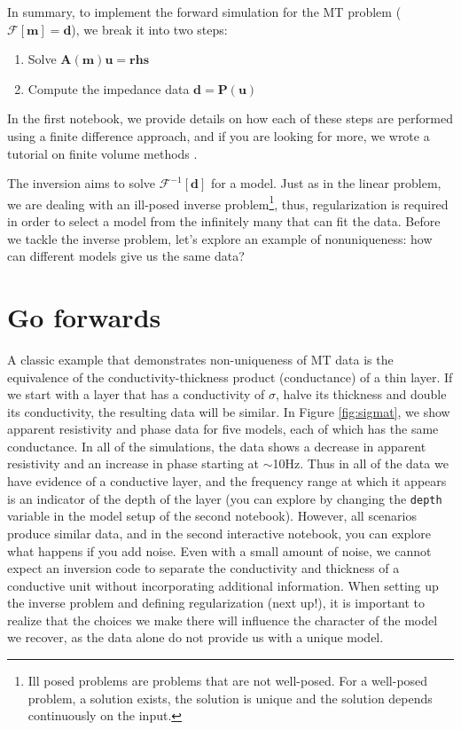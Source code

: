\documentclass[11pt,oneside]{article}
\begin{document}
In summary, to implement the forward simulation for the MT problem ($\mathcal{F}[\mathbf{m}] = \mathbf{d}$), we break it into two steps:
\begin{enumerate}
    \item Solve $\mathbf{A}(\mathbf{m})\mathbf{u} = \mathbf{rhs}$
    \item Compute the impedance data $\mathbf{d} = \mathbf{P}(\mathbf{u})$
\end{enumerate}
In the first notebook, we provide details on how each of these steps are performed using a finite difference approach, and if you are looking for more, we wrote a tutorial on finite volume methods \citep{Cockett2016}.

The inversion aims to solve $\mathcal{F}^{-1}[\mathbf{d}]$ for a model. Just as in the linear problem, we are dealing with an ill-posed inverse problem\footnote{Ill posed problems are problems that are not well-posed. For a well-posed problem, a solution exists, the solution is unique and the solution depends continuously on the input.}, thus, regularization is required in order to select a model from the infinitely many that can fit the data. Before we tackle the inverse problem, let's explore an example of nonuniqueness: how can different models give us the same data?

\section{Go forwards}

A classic example that demonstrates non-uniqueness of MT data is the equivalence of the   conductivity-thickness product (conductance) of a thin layer. If we start with a layer that has a conductivity of $\sigma$, halve its thickness and double its conductivity, the resulting data will be similar. In Figure \ref{fig:sigmat}, we show apparent resistivity and phase data for five models, each of which has the same conductance. In all of the simulations, the data shows a decrease in apparent resistivity and an increase in phase starting at $\sim$10Hz. Thus in all of the data we have evidence of a conductive layer, and the frequency range at which it appears is an indicator of the depth of the layer (you can explore by changing the \texttt{depth} variable in the model setup of the second notebook). However, all scenarios produce similar data, and in the second interactive notebook, you can explore what happens if you add noise. Even with a small amount of noise, we cannot expect an inversion code to separate the conductivity and thickness of a conductive unit without incorporating additional information. When setting up the inverse problem and defining regularization (next up!), it is important to realize that the choices we make there will influence the character of the model we recover, as the data alone do not provide us with a unique model.
\end{document}
